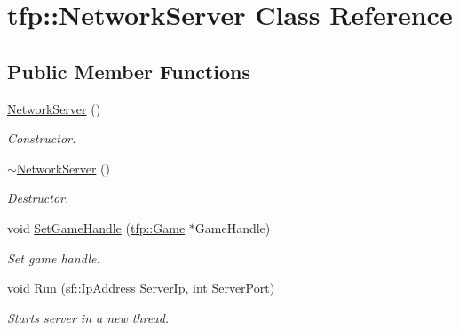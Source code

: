 \hypertarget{classtfp_1_1_network_server}{}\section{tfp\+:\+:Network\+Server Class Reference}
\label{classtfp_1_1_network_server}
\subsection*{Public Member Functions}
\begin{DoxyCompactItemize}
\item 
\mbox{\label{classtfp_1_1_network_server_a02057a60aa95fae70c8379faa03c79fc}} 
\mbox{\hyperlink{classtfp_1_1_network_server_a02057a60aa95fae70c8379faa03c79fc}{Network\+Server}} ()
\begin{DoxyCompactList}\small\item\em Constructor. \end{DoxyCompactList}\item 
\mbox{\label{classtfp_1_1_network_server_ac2fed7f35725052c48ec0c7bd9e1f2d9}} 
\mbox{\hyperlink{classtfp_1_1_network_server_ac2fed7f35725052c48ec0c7bd9e1f2d9}{$\sim$\+Network\+Server}} ()
\begin{DoxyCompactList}\small\item\em Destructor. \end{DoxyCompactList}\item 
\mbox{\label{classtfp_1_1_network_server_affeadcb842da50c78f47b46e3663eff3}} 
void \mbox{\hyperlink{classtfp_1_1_network_server_affeadcb842da50c78f47b46e3663eff3}{Set\+Game\+Handle}} (\mbox{\hyperlink{classtfp_1_1_game}{tfp\+::\+Game}} $\ast$Game\+Handle)
\begin{DoxyCompactList}\small\item\em Set game handle. \end{DoxyCompactList}\item 
\mbox{\label{classtfp_1_1_network_server_a7cb2e252d7443e31f5ddd0bdec29f7e5}} 
void \mbox{\hyperlink{classtfp_1_1_network_server_a7cb2e252d7443e31f5ddd0bdec29f7e5}{Run}} (sf\+::\+Ip\+Address Server\+Ip, int Server\+Port)
\begin{DoxyCompactList}\small\item\em Starts server in a new thread. \end{DoxyCompactList}\item 

\end{DoxyCompactItemize}
